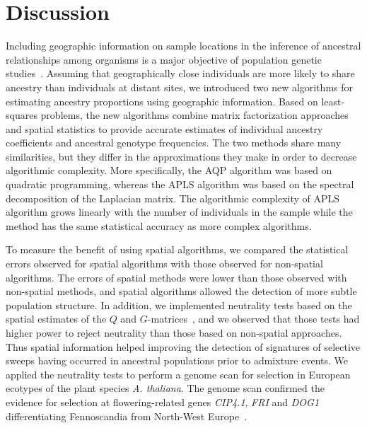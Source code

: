 \clearpage
\newpage



\section{Discussion}
Including geographic information on sample locations in the inference of
ancestral relationships among organisms is a major objective of population
genetic studies~\citep{Malecot1948, Cavalli-Sforza1994, Epperson2003}. Assuming
that geographically close individuals are more likely to share ancestry than
individuals at distant sites, we introduced two new algorithms for estimating
ancestry proportions using geographic information. Based on least-squares
problems, the new algorithms combine matrix factorization approaches and spatial
statistics to provide accurate estimates of individual ancestry coefficients and
ancestral genotype frequencies. The two methods share many similarities, but
they differ in the approximations they make in order to decrease algorithmic
complexity. More specifically, the AQP algorithm was based on quadratic
programming, whereas the APLS algorithm was based on the spectral decomposition
of the Laplacian matrix. The algorithmic complexity of APLS algorithm grows
linearly with the number of individuals in the sample while the method has the
same statistical accuracy as more complex algorithms.


To measure the benefit of using spatial algorithms, we compared the statistical
errors observed for spatial algorithms with those observed for non-spatial
algorithms. The errors of spatial methods were lower than those observed with
non-spatial methods, and spatial algorithms allowed the detection of more subtle
population structure. In addition, we implemented neutrality tests based on the
spatial estimates of the $Q$ and $G$-matrices~\citep{Martins2016}, and we
observed that those tests had higher power to reject neutrality than those based
on non-spatial approaches. Thus spatial information helped improving the
detection of signatures of selective sweeps having occurred in ancestral
populations prior to admixture events. We applied the neutrality tests to
perform a genome scan for selection in European ecotypes of the plant species
{\it A. thaliana}. The genome scan confirmed the evidence for selection at
flowering-related genes {\it CIP4.1}, {\it FRI} and {\it DOG1} differentiating
Fennoscandia from North-West Europe~\citep{Horton2012}.

